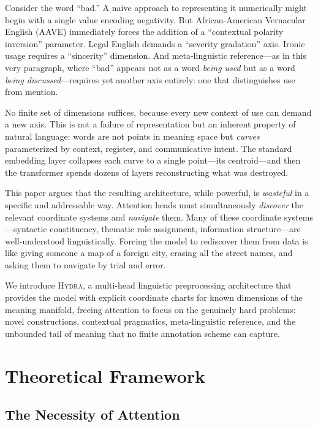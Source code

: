 \documentclass[11pt]{article}
\begin{document}
Consider the word ``bad.'' A naive approach to representing it numerically might 
begin with a single value encoding negativity. But African-American Vernacular English 
(AAVE) immediately forces the addition of a ``contextual polarity inversion'' parameter. 
Legal English demands a ``severity gradation'' axis. Ironic usage requires a ``sincerity'' 
dimension. And meta-linguistic reference---as in this very paragraph, where ``bad'' 
appears not as a word \emph{being used} but as a word \emph{being discussed}---requires 
yet another axis entirely: one that distinguishes use from mention.

No finite set of dimensions suffices, because every new context of use can demand a 
new axis. This is not a failure of representation but an inherent property of natural 
language: words are not points in meaning space but \emph{curves} parameterized by 
context, register, and communicative intent. The standard embedding layer collapses 
each curve to a single point---its centroid---and then the transformer spends dozens 
of layers reconstructing what was destroyed.

This paper argues that the resulting architecture, while powerful, is \emph{wasteful} 
in a specific and addressable way. Attention heads must simultaneously 
\emph{discover} the relevant coordinate systems and \emph{navigate} them. Many of 
these coordinate systems---syntactic constituency, thematic role assignment, 
information structure---are well-understood linguistically. Forcing the model to 
rediscover them from data is like giving someone a map of a foreign city, erasing 
all the street names, and asking them to navigate by trial and error.

We introduce \textsc{Hydra}, a multi-head linguistic preprocessing architecture 
that provides the model with explicit coordinate charts for known dimensions of 
the meaning manifold, freeing attention to focus on the genuinely hard problems: 
novel constructions, contextual pragmatics, meta-linguistic reference, and the 
unbounded tail of meaning that no finite annotation scheme can capture.

\section{Theoretical Framework}
\label{sec:theory}

\subsection{The Necessity of Attention}
\label{sec:necessity}
\end{document}

